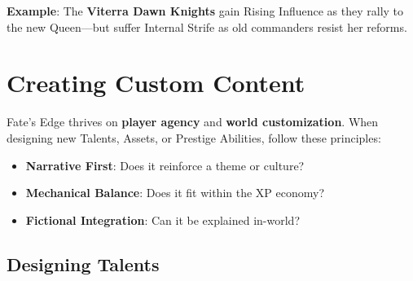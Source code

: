 \textbf{Example}: The \textbf{Viterra Dawn Knights} gain Rising Influence as they rally to the new Queen—but suffer Internal Strife as old commanders resist her reforms.

\section*{Creating Custom Content}

Fate's Edge thrives on \textbf{player agency} and \textbf{world customization}. When designing new Talents, Assets, or Prestige Abilities, follow these principles:

\begin{itemize}
    \item \textbf{Narrative First}: Does it reinforce a theme or culture?
    \item \textbf{Mechanical Balance}: Does it fit within the XP economy?
    \item \textbf{Fictional Integration}: Can it be explained in-world?
\end{itemize}

\subsection*{Designing Talents}

